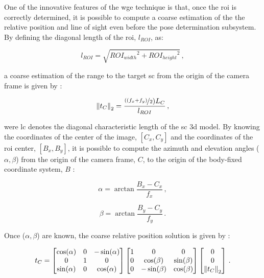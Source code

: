 One of the innovative features of the \acrshort{wge} technique is that, once the \acrshort{roi} is correctly determined, it is possible to compute a coarse estimation of the the relative position and line of sight even before the pose determination subsystem. By defining the diagonal length of the \acrshort{roi}, $l_{ROI}$, as:

\begin{equation}
l_{ROI} = \sqrt{{ROI_{width}}^2 + {ROI_{height}}^2} \,,
\end{equation}

a coarse estimation of the range to the target \acrshort{sc} from the origin of the camera frame is given by :

\begin{equation}
\left\lVert t_C\right\rVert_2 = \frac{\nicefrac{((f_x+f_y)}{2}) L_C}{l_{ROI}} \,,
\end{equation}

were \gls{lc} denotes the diagonal characteristic length of the \acrshort{sc} \acrshort{3d} model. By knowing the coordinates of the center of the image, $[C_x, C_y]$ and the coordinates of the \acrshort{roi} center, $[B_x, B_y]$, it is possible to compute the azimuth and elevation angles ($\alpha, \beta$) from the origin of the camera frame, $C$, to the origin of the body-fixed coordinate system, $B$ :

\begin{equation}
\alpha = \arctan{\frac{B_x - C_x}{f_x}} \,,
\end{equation}

\begin{equation}
\beta = \arctan{\frac{B_y - C_y}{f_y}} \,.
\end{equation}

Once ($\alpha, \beta$) are known, the coarse relative position solution is given by : 

\begin{equation}
  t_C
  =
  \begin{bmatrix}
    \cos(\alpha) & 0 & -\sin(\alpha) \\
    0 & 1 & 0 \\
    \sin(\alpha) & 0 & \cos(\alpha)
  \end{bmatrix}
  \begin{bmatrix}
    1 & 0 & 0 \\
    0 & \cos(\beta) & \sin(\beta) \\
    0 & -\sin(\beta) & \cos(\beta)
  \end{bmatrix}
  \begin{bmatrix}
    0 \\
    0 \\
   \left\lVert t_C\right\rVert_2
  \end{bmatrix} \,.
\end{equation}

